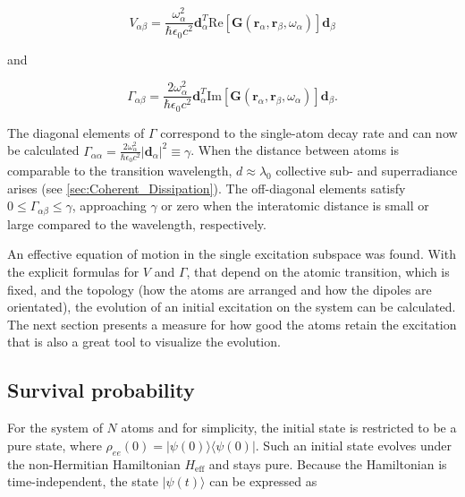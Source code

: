 \begin{equation}\label{eq:V_matrix}
V_{\alpha \beta} = \frac{\omega_\alpha^2}{\hbar \epsilon_0 c^2}\mathbf{d}_\alpha^T \mathrm{Re}[\mathbf{G}(\mathbf{r}_\alpha, \mathbf{r}_\beta, \omega_\alpha)] \mathbf{d}_\beta
\end{equation}

\noindent
and

\begin{equation}\label{eq:Gamma_matrix}
\Gamma_{\alpha \beta} = \frac{2 \omega_\alpha^2}{\hbar \epsilon_0 c^2}\mathbf{d}_\alpha^T \mathrm{Im}[\mathbf{G}(\mathbf{r}_\alpha, \mathbf{r}_\beta, \omega_\alpha)] \mathbf{d}_\beta.
\end{equation}

\noindent
The diagonal elements of \(\Gamma\) correspond to the single-atom decay rate and can now be calculated  \(\Gamma_{\alpha \alpha} = \frac{2 \omega_\alpha^2}{\hbar \epsilon_0 c^2} \vert \mathbf{d}_{\alpha} \vert^2 \equiv \gamma\).
When the distance between atoms is comparable to the transition wavelength,
\(d \approx \lambda_0\) collective sub- and superradiance arises
(see \autoref{sec:Coherent_Dissipation}).
The off-diagonal elements satisfy \(0 \leq \Gamma_{\alpha \beta} \leq \gamma\), approaching \(\gamma\) or zero when the interatomic distance is small or large compared to the wavelength, respectively.

\noindent
An effective equation of motion in the single excitation subspace was found.
With the explicit formulas for $ V $ and $ \Gamma $, that depend on the atomic transition, which is fixed, and the topology
(how the atoms are arranged and how the dipoles are orientated),
the evolution of an initial excitation on the system can be calculated.
The next section presents a measure for how good the atoms retain the excitation that is also a great tool to visualize the evolution.



\subsection{Survival probability}

\noindent
For the system of \( N \) atoms and for simplicity, the initial state is restricted to be a pure state, where \( \rho_{ee}(0) = \vert \psi(0) \rangle \langle \psi(0) \vert \).
Such an initial state evolves under the non-Hermitian Hamiltonian \( H_{\text{eff}} \) and stays pure.
Because the Hamiltonian is time-independent, the state $\vert  \psi(t) \rangle$ can be expressed as

